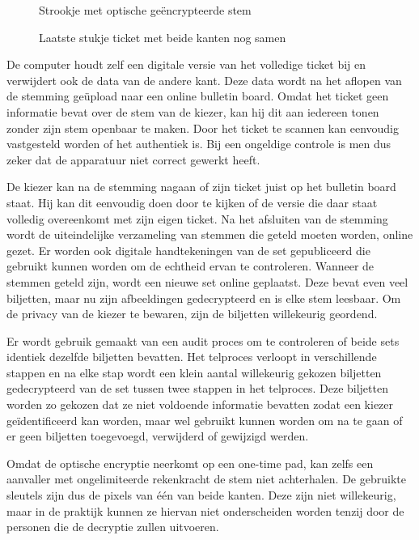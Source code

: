\begin{figure}
  \caption{Strookje met optische ge\"encrypteerde stem\cite{chaum_secret_ballot}}
  \label{fig:ls:secret_ballot_vote}
\end{figure}

\begin{figure}
  \caption{Laatste stukje ticket met beide kanten nog samen\cite{chaum_secret_ballot}}
  \label{fig:ls:secret_ballot_receipt}
\end{figure}

\npar De computer houdt zelf een digitale versie van het volledige ticket bij en verwijdert ook de data van de andere kant. Deze data wordt na het aflopen van de stemming ge\"upload naar een online bulletin board. Omdat het ticket geen informatie bevat over de stem van de kiezer, kan hij dit aan iedereen tonen zonder zijn stem openbaar te maken. Door het ticket te scannen kan eenvoudig vastgesteld worden of het authentiek is. Bij een ongeldige controle is men dus zeker dat de apparatuur niet correct gewerkt heeft.

\npar De kiezer kan na de stemming nagaan of zijn ticket juist op het bulletin board staat. Hij kan dit eenvoudig doen door te kijken of de versie die daar staat volledig overeenkomt met zijn eigen ticket. Na het afsluiten van de stemming wordt de uiteindelijke verzameling van stemmen die geteld moeten worden, online gezet. Er worden ook digitale handtekeningen van de set gepubliceerd die gebruikt kunnen worden om de echtheid ervan te controleren. Wanneer de stemmen geteld zijn, wordt een nieuwe set online geplaatst. Deze bevat even veel biljetten, maar nu zijn afbeeldingen gedecrypteerd en is elke stem leesbaar. Om de privacy van de kiezer te bewaren, zijn de biljetten willekeurig geordend.

\npar Er wordt gebruik gemaakt van een audit proces om te controleren of beide sets identiek dezelfde biljetten bevatten. Het telproces verloopt in verschillende stappen en na elke stap wordt een klein aantal willekeurig gekozen biljetten gedecrypteerd van de set tussen twee stappen in het telproces. Deze biljetten worden zo gekozen dat ze niet voldoende informatie bevatten zodat een kiezer ge\"identificeerd kan worden, maar wel gebruikt kunnen worden om na te gaan of er geen biljetten toegevoegd, verwijderd of gewijzigd werden.

\npar Omdat de optische encryptie neerkomt op een one-time pad, kan zelfs een aanvaller met ongelimiteerde rekenkracht de stem niet achterhalen. De gebruikte sleutels zijn dus de pixels van één van beide kanten. Deze zijn niet willekeurig, maar in de praktijk kunnen ze hiervan niet onderscheiden worden tenzij door de personen die de decryptie zullen uitvoeren.

